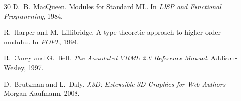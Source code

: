 \documentclass[sigconf,nonacm]{acmart}
\begin{document}
\begin{thebibliography}{30}
D.~B.~MacQueen.
\newblock Modules for Standard ML.
\newblock In \emph{LISP and Functional Programming}, 1984.

R.~Harper and M.~Lillibridge.
\newblock A type-theoretic approach to higher-order modules.
\newblock In \emph{POPL}, 1994.

R.~Carey and G.~Bell.
\newblock \emph{The Annotated VRML 2.0 Reference Manual}.
\newblock Addison-Wesley, 1997.

D.~Brutzman and L.~Daly.
\newblock \emph{X3D: Extensible 3D Graphics for Web Authors}.
\newblock Morgan Kaufmann, 2008.

\end{thebibliography}
\fi
\end{document}
